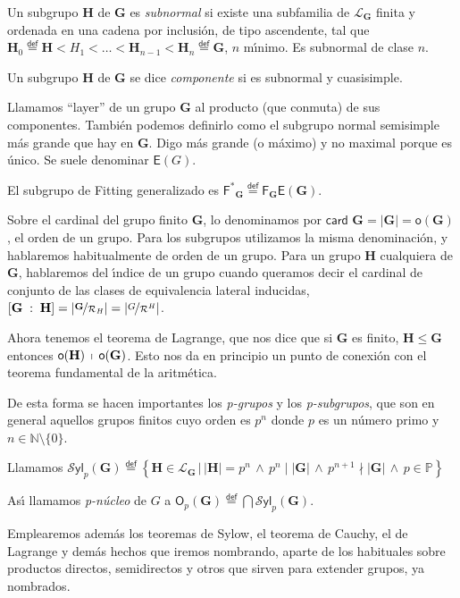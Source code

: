 \documentclass[final,12pt,a4paper,twoside,fleqn]{extbook}
\newcommand{\entreparentesis}[1]{\ensuremath{
        \left({#1}\right)
}}
\newcommand{\entrecorchetes}[1]{\ensuremath{
        \left\lbrack{#1}\right\rbrack
}}
\newcommand{\mathdef}{\ensuremath{\stackrel{\mathsf{def}}{{}={}}}}
\newcommand{\extset}[2]{\ensuremath{
        \left\lbrace{#1}\,\vert\,{#2}\right\rbrace
}}
\newcommand{\setN}{\ensuremath{\mathds{N}}}
\newcommand{\ly}{\ensuremath{         \wedge         }}
\newcommand{\setP}{\ensuremath{}\mathbb{P}}
\newcommand{\grG}{\ensuremath{\mathbf{G}}}
\newcommand{\grH}{\ensuremath{\mathbf{H}}}
\newcommand{\subgr}{\ensuremath{<}}
\newcommand{\subgreq}{\ensuremath{\leqslant}}
\newcommand{\grlattice}[1]{\ensuremath{
        {\mathcal{L}}_{#1}
}}
\newcommand{\psylowlattice}[2]{\ensuremath{
        {{\mathcal{S}\mathsf{yl}}_{#2}}
        \entreparentesis{#1}
}}
\newcommand{\grcoc}[2]{\ensuremath{
        \nicefrac{#1}{#2}
}}
\newcommand{\fitting}[1]{\ensuremath{{\bm{\mathsf{F}}}_{#1}}}
\newcommand{\gfitting}[1]{\ensuremath{{\bm{\mathsf{F}^{*}}}_{#1}}}
\newcommand{\indice}[2]{\ensuremath{\entrecorchetes{{#1}\;:\;{#2}}}}
\theoremstyle{definition}
\theoremstyle{remark}
\begin{document}
Un subgrupo $\grH$ de $\grG$ es \emph{subnormal} si existe una subfamilia de
$\grlattice{\grG}$ finita y ordenada en una cadena por inclusi\'on, de
tipo ascendente, tal que
$\grH_0 \mathdef \grH\subgr H_1 \subgr \ldots \subgr \grH_{n-1} \subgr \grH_n \mathdef \grG$, $n$ m{\'{\i}}nimo.
Es subnormal de clase $n$.

Un subgrupo $\grH$ de $\grG$ se dice \emph{componente} si es subnormal y cuasisimple.

Llamamos ``layer'' de un grupo $\grG$ al producto (que conmuta) de sus componentes.
Tambi\'en podemos definirlo como el subgrupo normal semisimple m\'as grande que hay en $\grG$.
Digo m\'as grande (o m\'aximo) y no maximal porque es \'unico. Se suele denominar $\mathsf{E}(G)$.

El subgrupo de Fitting generalizado es
$\gfitting{\grG} \mathdef \fitting{\grG} \mathsf{E}(\grG)$.

Sobre el cardinal del grupo finito $\grG$, lo denominamos por
$\textsf{card }\grG = \left| \grG \right| = \mathsf{o}(\grG)$, el orden de un grupo.
Para los subgrupos utilizamos la misma denominaci\'on, y hablaremos
habitualmente de orden de un grupo. Para un grupo $\grH$ cualquiera
de $\grG$, hablaremos del {\'{\i}}ndice de un grupo cuando queramos decir
el cardinal de conjunto de las clases de equivalencia lateral inducidas,
$\indice{\grG}{\grH} = \left| \grcoc{\grG}{\mathcal{R}_H} \right| =
\left| \grcoc{G}{\mathcal{R}^H} \right| $.

Ahora tenemos el teorema de Lagrange, que nos dice que si $\grG$ es finito,
$\grH\subgreq\grG$ entonces ${\mathsf{o}(\grH)} \,\shortmid\, {{\mathsf{o}}(\grG)}$.
Esto nos da en principio un punto de conexi\'on con el teorema fundamental de la aritm\'etica.

De esta forma se hacen importantes los \emph{p-grupos} y los
\emph{p-subgrupos}, que son en general aquellos grupos finitos cuyo
orden es $p^n$ donde $p$ es un n\'umero primo y
$n             \in \setN\setminus\lbrace 0\rbrace$.

Llamamos $
{\psylowlattice{\grG}{p}}
\mathdef
{\extset
	{\grH          \in \grlattice{\grG}}	
	{
		{\left| {\grH} \right|}={p^n}\,\ly\,
		{p^n} ∣{\left| {\grG} \right|}\,\ly\,
		{{p}^{n+1}} \nmid {\left| \grG \right|\,\ly\, p  \in \setP}
	}
}$

As{\'{\i}} llamamos \emph{p-n\'ucleo} de $G$ a
$\mathsf{O}_{p}(\grG) \mathdef \bigcap {\psylowlattice{\grG}{p}}$.

Emplearemos adem\'as los teoremas de Sylow, el teorema de Cauchy, el de Lagrange y
dem\'as hechos que iremos nombrando, aparte de los habituales sobre productos directos,
semidirectos y otros que sirven para extender grupos, ya nombrados.
\end{document}
